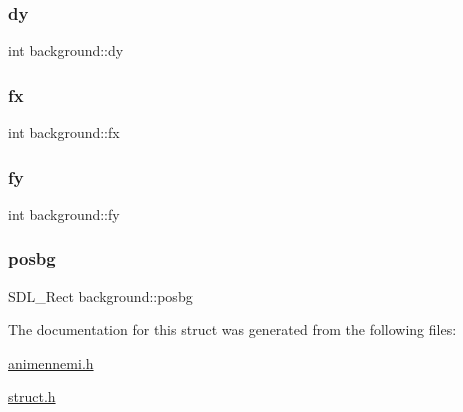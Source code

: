 \mbox{\label{structbackground_a060b0876d21025fb57566f0d89add548}} 
\subsubsection{\texorpdfstring{dy}{dy}}
{\footnotesize\ttfamily int background\+::dy}

\mbox{\label{structbackground_a81b2b6107bd84a5246251e975bd25914}} 
\subsubsection{\texorpdfstring{fx}{fx}}
{\footnotesize\ttfamily int background\+::fx}

\mbox{\label{structbackground_ad44a25e18db23c9b04196652482b6087}} 
\subsubsection{\texorpdfstring{fy}{fy}}
{\footnotesize\ttfamily int background\+::fy}

\mbox{\label{structbackground_a54134b1806f4894024b03d480ebe1b6b}} 
\subsubsection{\texorpdfstring{posbg}{posbg}}
{\footnotesize\ttfamily S\+D\+L\+\_\+\+Rect background\+::posbg}



The documentation for this struct was generated from the following files\+:\begin{DoxyCompactItemize}
\item 
\hyperlink{animennemi_8h}{animennemi.\+h}\item 
\hyperlink{struct_8h}{struct.\+h}\end{DoxyCompactItemize}
